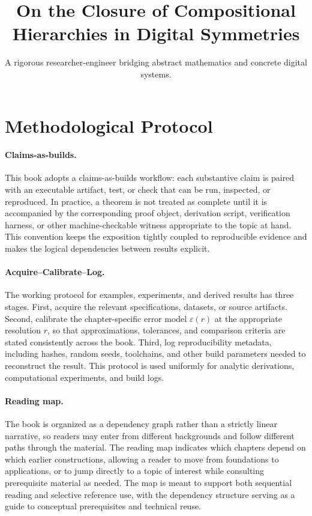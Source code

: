\documentclass[11pt]{article}
\title{On the Closure of Compositional Hierarchies in Digital Symmetries}
\author{A rigorous researcher-engineer bridging abstract mathematics and concrete digital systems.}
\begin{document}
\section*{Methodological Protocol}

\paragraph{Claims-as-builds.}
This book adopts a claims-as-builds workflow: each substantive claim is paired with an executable artifact, test, or check that can be run, inspected, or reproduced. In practice, a theorem is not treated as complete until it is accompanied by the corresponding proof object, derivation script, verification harness, or other machine-checkable witness appropriate to the topic at hand. This convention keeps the exposition tightly coupled to reproducible evidence and makes the logical dependencies between results explicit.

\paragraph{Acquire--Calibrate--Log.}
The working protocol for examples, experiments, and derived results has three stages. First, acquire the relevant specifications, datasets, or source artifacts. Second, calibrate the chapter-specific error model \(\varepsilon(r)\) at the appropriate resolution \(r\), so that approximations, tolerances, and comparison criteria are stated consistently across the book. Third, log reproducibility metadata, including hashes, random seeds, toolchains, and other build parameters needed to reconstruct the result. This protocol is used uniformly for analytic derivations, computational experiments, and build logs.

\paragraph{Reading map.}
The book is organized as a dependency graph rather than a strictly linear narrative, so readers may enter from different backgrounds and follow different paths through the material. The reading map indicates which chapters depend on which earlier constructions, allowing a reader to move from foundations to applications, or to jump directly to a topic of interest while consulting prerequisite material as needed. The map is meant to support both sequential reading and selective reference use, with the dependency structure serving as a guide to conceptual prerequisites and technical reuse.
\end{document}
